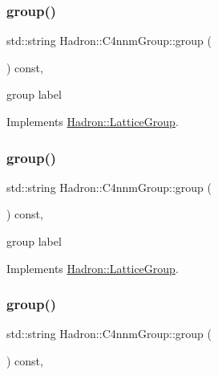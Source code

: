 \subsubsection{\texorpdfstring{group()}{group()}\hspace{0.1cm}{\footnotesize\ttfamily [1/3]}}
{\footnotesize\ttfamily std\+::string Hadron\+::\+C4nnm\+Group\+::group (\begin{DoxyParamCaption}{ }\end{DoxyParamCaption}) const\hspace{0.3cm}{\ttfamily [inline]}, {\ttfamily [virtual]}}

group label 

Implements \mbox{\hyperlink{structHadron_1_1LatticeGroup_a82208a322bf1b1db489f16af38e70087}{Hadron\+::\+Lattice\+Group}}.

\mbox{\label{structHadron_1_1C4nnmGroup_a9f35739dbd3ad6effd0e675d40b5341d}} 
\subsubsection{\texorpdfstring{group()}{group()}\hspace{0.1cm}{\footnotesize\ttfamily [2/3]}}
{\footnotesize\ttfamily std\+::string Hadron\+::\+C4nnm\+Group\+::group (\begin{DoxyParamCaption}{ }\end{DoxyParamCaption}) const\hspace{0.3cm}{\ttfamily [inline]}, {\ttfamily [virtual]}}

group label 

Implements \mbox{\hyperlink{structHadron_1_1LatticeGroup_a82208a322bf1b1db489f16af38e70087}{Hadron\+::\+Lattice\+Group}}.

\mbox{\label{structHadron_1_1C4nnmGroup_a9f35739dbd3ad6effd0e675d40b5341d}} 
\subsubsection{\texorpdfstring{group()}{group()}\hspace{0.1cm}{\footnotesize\ttfamily [3/3]}}
{\footnotesize\ttfamily std\+::string Hadron\+::\+C4nnm\+Group\+::group (\begin{DoxyParamCaption}{ }\end{DoxyParamCaption}) const\hspace{0.3cm}{\ttfamily [inline]}, {\ttfamily [virtual]}}

